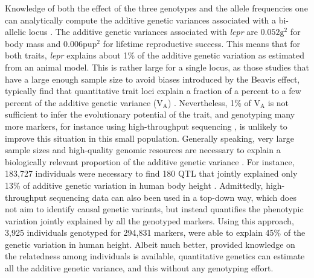 Knowledge of both the effect of the three genotypes and the allele frequencies one can analytically compute the additive genetic variances associated with a bi-allelic locus \parencite[][p77]{Fisher1941average,Lynch1998}. The additive genetic variances associated with \emph{lepr} are $0.052 \text{g}^2$ for body mass and $0.006 \text{pup}^2$ for lifetime reproductive success. This means that for both traits, \emph{lepr} explains about 1\% of the additive genetic variation as estimated from an animal model. This is rather large for a single locus, as those studies that have a large enough sample size to avoid biases introduced by the Beavis effect, typically find that quantitative trait loci explain a fraction of a percent to a few percent of the additive genetic variance (V$_\text{A}$) \parencite{Flint2009,Jensen2014}. Nevertheless, 1\% of V$_\text{A}$ is not sufficient to infer the evolutionary potential of the trait, and genotyping many more markers, for instance using high-throughput sequencing \parencite{Goodwin2016}, is unlikely to improve this situation in this small population. Generally speaking, very large sample sizes and high-quality genomic resources are necessary to explain a biologically relevant proportion of the additive genetic variance \parencite{Bloom2013, Jensen2014}. For instance, 183,727 individuals were necessary to find 180 QTL that jointly explained only 13\% of additive genetic variation in human body height \parencite{LangoAllen2010}. Admittedly, high-throughput sequencing data can also been used in a top-down way, which does not aim to identify causal genetic variants, but instead quantifies the phenotypic variation jointly explained by all the genotyped markers. Using this approach, 3,925 individuals genotyped for 294,831 markers, \parencite{Yang2010} were able to explain 45\% of the genetic variation in human height. Albeit much better, provided knowledge on the relatedness among individuals is available, quantitative genetics can estimate all the additive genetic variance, and this without any genotyping effort.

